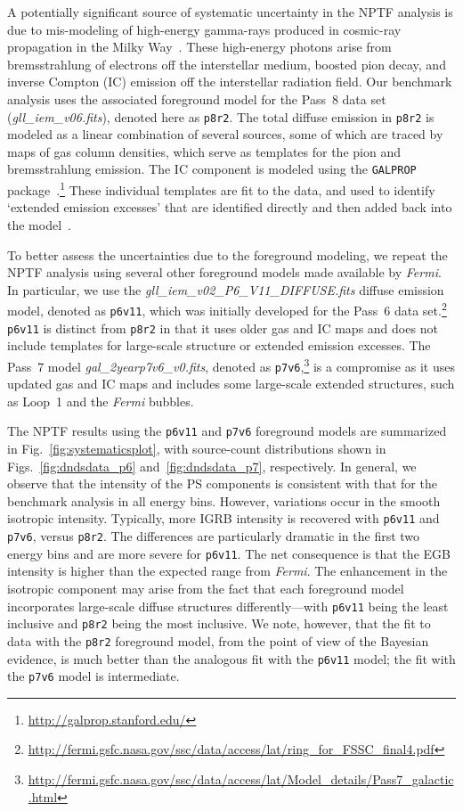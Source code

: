 A potentially significant source of systematic uncertainty in the NPTF analysis is due to mis-modeling of high-energy gamma-rays produced in cosmic-ray propagation in the Milky Way~\cite{Ackermann:2012pya}.  These high-energy photons arise from  bremsstrahlung of electrons off the interstellar medium, boosted pion decay, and inverse Compton (IC)  emission off the interstellar radiation field.  Our benchmark analysis uses 
the associated foreground model for the Pass~8 data set (\emph{gll\_iem\_v06.fits}), denoted here as \texttt{p8r2}.  The total diffuse emission in \texttt{p8r2} is modeled as a linear combination of several sources, some of which are traced by maps of gas column densities, which serve as templates for the pion and bremsstrahlung emission.  The IC component is modeled using the \texttt{GALPROP} package~\cite{Strong:2007nh}.\footnote{\url{http://galprop.stanford.edu/}}  These individual templates are fit to the data, and used to identify `extended emission excesses' that are identified directly and then added back into the model~\cite{Acero-2016}.

To better assess the uncertainties due to the foreground modeling, we repeat the NPTF analysis using several other foreground models made available by \emph{Fermi}.  In particular, we use the \emph{gll\_iem\_v02\_P6\_V11\_DIFFUSE.fits} diffuse emission model, denoted as \texttt{p6v11}, which was initially developed for the Pass~6 data set.\footnote{\url{http://fermi.gsfc.nasa.gov/ssc/data/access/lat/ring_for_FSSC_final4.pdf}}  \texttt{p6v11} is distinct from \texttt{p8r2} in that it uses older gas and IC maps and does not include templates for large-scale structure or extended emission excesses.  The Pass~7 model \emph{gal\_2yearp7v6\_v0.fits}, denoted as \texttt{p7v6},\footnote{\url{http://fermi.gsfc.nasa.gov/ssc/data/access/lat/Model_details/Pass7_galactic.html}} is a compromise as it uses updated gas and IC maps and includes some large-scale extended structures, such as Loop~1 and the \emph{Fermi} bubbles.

The NPTF results using the \texttt{p6v11} and \texttt{p7v6} foreground models are summarized in Fig.~\ref{fig:systematicsplot}, with source-count distributions  shown in Figs.~\ref{fig:dndsdata_p6} and~\ref{fig:dndsdata_p7}, respectively. In general, we observe that the intensity of the PS components is consistent with that for the benchmark analysis in all energy bins.  However, variations occur in the smooth isotropic intensity.  Typically, more IGRB intensity is recovered with \texttt{p6v11} and \texttt{p7v6}, versus \texttt{p8r2}.  The differences are particularly dramatic in the first two energy bins and are more severe for \texttt{p6v11}.  The net consequence is that the EGB intensity is higher than the expected range from \emph{Fermi}.  The enhancement in the isotropic component may arise from the fact that each foreground model incorporates large-scale diffuse structures differently---with \texttt{p6v11} being the least inclusive and \texttt{p8r2} being the most inclusive.  We note, however, that the fit to data with the \texttt{p8r2} foreground model, from the point of view of the Bayesian evidence, is much better than the analogous fit with the  \texttt{p6v11} model; the fit with the \texttt{p7v6} model is intermediate. 

